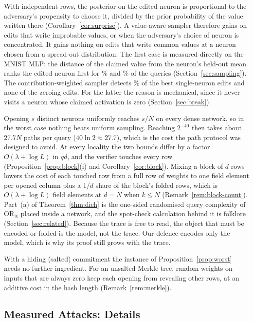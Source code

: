  With independent rows, the posterior on the edited neuron is
proportional to the adversary's propensity to choose it, divided by the prior probability of the
value written there (Corollary~\ref{cor:surprise}). A value-aware sampler therefore gains on edits
that write improbable values, or when the adversary's choice of neuron is concentrated. It gains
nothing on edits that write common values at a neuron chosen from a spread-out distribution. The first case is measured directly on the
MNIST MLP: the distance of the claimed value from the neuron's held-out mean ranks the edited
neuron first for \LocatorOne{}\% and \LocatorTwo{}\% of the queries (Section~\ref{sec:sampling}).
The contribution-weighted sampler detects \SamplerContribution{}\% of the best single-neuron
edits and none of the zeroing edits. For the latter the reason is mechanical, since it never visits
a neuron whose claimed activation is zero (Section~\ref{sec:break}).

 Opening $s$ distinct neurons uniformly reaches $s/N$ on every dense
network, so in the worst case nothing beats uniform sampling. Reaching $2^{-40}$ then takes about
$27.7N$ paths per query ($40\ln2\approx27.7$), which is the cost the path protocol was designed to
avoid. At every locality the two bounds differ by a factor $O(\lambda+\log L)$ in $qd$, and the
verifier touches every row (Proposition~\ref{prop:block}(i) and Corollary~\ref{cor:block}). Mixing a
block of $d$ rows lowers the cost of each touched row from a full row of weights to one field element
per opened column plus a $1/d$ share of the block's folded rows, which is $O(\lambda+\log L)$ field
elements at $d=N$ when $k\le N$ (Remark~\ref{rem:block-count}). Part~(a) of
Theorem~\ref{thm:dich} is the one-sided randomised query complexity of
$\mathrm{OR}_N$ placed inside a network, and the spot-check calculation behind it is folklore
(Section~\ref{sec:related}). Because the trace is free to read, the object that must be encoded or
folded is the model, not the trace. Our defence encodes only the model, which is why its proof
still grows with the trace.

 With a hiding (salted) commitment the instance of
Proposition~\ref{prop:worst} needs no further ingredient. For an unsalted Merkle tree, random
weights on inputs that are always zero keep each opening from revealing other rows, at an additive
cost in the hash length (Remark~\ref{rem:merkle}).

\subsection{Measured Attacks: Details}
\label{ext:attack-measure}

